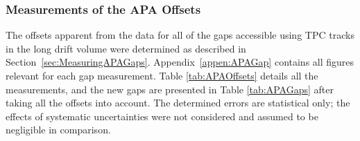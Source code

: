\subsubsection{Measurements of the APA Offsets}\label{sec:APAOffsetMeasurements}

The offsets apparent from the data for all of the gaps accessible using TPC tracks in the long drift volume were determined as described in Section~\ref{sec:MeasuringAPAGaps}.  Appendix~\ref{appen:APAGap} contains all figures relevant for each gap measurement.  Table \ref{tab:APAOffsets} details all the measurements, and the new gaps are presented in Table \ref{tab:APAGaps} after taking all the offsets into account.  The determined errors are statistical only; the effects of systematic uncertainties were not considered and assumed to be negligible in comparison.

